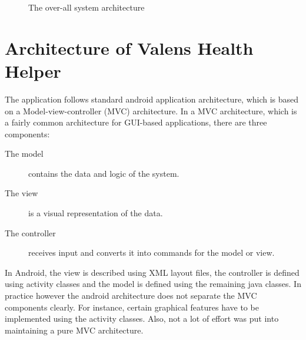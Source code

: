 \begin{figure}[p]

\setlength\fboxsep{0pt}
\setlength\fboxrule{1pt}\noindent{}

\caption{The over-all system architecture}
\label{fig:Architecture}
\end{figure}


\section{Architecture of Valens Health Helper}
The application follows standard android application architecture, which is based on a Model-view-controller (MVC) architecture. In a MVC architecture, which is a fairly common architecture for GUI-based applications, there are three components:

\begin{description}
\item[The model] contains the data and logic of the system.
\item[The view] is a visual representation of the data. 
\item[The controller] receives input and converts it into commands for the model or view. 
\end{description}

In Android, the view is described using XML layout files, the controller is defined using activity classes and the model is defined using the remaining java classes. In practice however the android architecture does not separate the MVC components clearly. For instance, certain graphical features have to be implemented using the activity classes. Also, not a lot of effort was put into maintaining a pure MVC architecture.%

